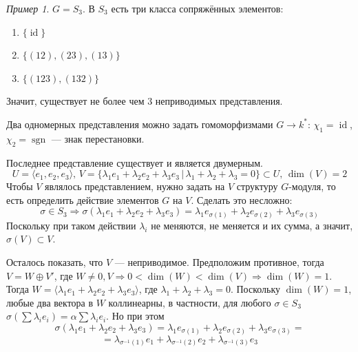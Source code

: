 \documentclass{article}
\theoremstyle{definition}
\theoremstyle{remark}
\newtheorem*{example}{Пример}
\DeclareMathOperator{\id}{id}
\DeclareMathOperator{\sgn}{sgn}
\newcommand{\Ra}{\Rightarrow}
\begin{document}
\begin{example}
    $G = S_3$. В $S_3$ есть три класса сопряжённых элементов:
    \begin{enumerate}
        \item $\{\id\}$
        \item $\{(12), (23), (13)\}$
        \item $\{(123), (132)\}$
    \end{enumerate}
    Значит, существует не более чем 3 неприводимых представления.

    Два одномерных представления можно задать гомоморфизмами $G \to k^*$: $\chi_1 = \id$, $\chi_2 = \sgn$ --- знак перестановки.

    Последнее представление существует и является двумерным.
    \begin{equation*}
        U = \langle e_1, e_2, e_3 \rangle,\, V = \{ \lambda_1 e_1 + \lambda_2 e_2 + \lambda_3 e_3 \,|\, \lambda_1 + \lambda_2 + \lambda_3 = 0 \} \subset U,\, \dim(V) = 2
    \end{equation*}
    Чтобы $V$ являлось представлением, нужно задать на $V$ структуру $G$-модуля, то есть определить действие элементов $G$ на $V$. Сделать это несложно:
    \begin{equation*}
        \sigma \in S_3 \Ra \sigma(\lambda_1 e_1 + \lambda_2 e_2 + \lambda_3 e_3) = \lambda_1 e_{\sigma(1)} + \lambda_2 e_{\sigma(2)} + \lambda_3 e_{\sigma(3)}
    \end{equation*}
    Поскольку при таком действии $\lambda_i$ не меняются, не меняется и их сумма, а значит, $\sigma(V) \subset V$.
    
    Осталось показать, что $V$ --- неприводимое. Предположим противное, тогда $V = W \oplus V'$, где $W \neq 0, V \Ra 0 < \dim(W) < \dim(V) \Ra \dim(W) = 1$. Тогда $W = \langle \lambda_1 e_1 + \lambda_2 e_2 + \lambda_3 e_3 \rangle$, где $\lambda_1 + \lambda_2 + \lambda_3 = 0$. Поскольку $\dim(W) = 1$, любые два вектора в $W$ коллинеарны, в частности, для любого $\sigma \in S_3$ $\sigma(\sum \lambda_i e_i) = \alpha \sum \lambda_i e_i$. Но при этом
$$\sigma(\lambda_1 e_1 + \lambda_2 e_2 + \lambda_3 e_3) = \lambda_1 e_{\sigma(1)} + \lambda_2 e_{\sigma(2)} + \lambda_3 e_{\sigma(3)} =$$
$$= \lambda_{\sigma^{-1}(1)} e_1 + \lambda_{\sigma^{-1}(2)} e_2 + \lambda_{\sigma^{-1}(3)} e_3$$
    

\end{example}
\end{document}
